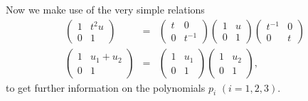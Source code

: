 Now we make use of the very simple relations
\begin{eqnarray}
\label{eq:no1a}
\left(\begin{matrix} 1 & t^2u \\ 0 & 1\end{matrix}\right) &=&
\left(\begin{matrix} t & 0 \\ 0 & t^{-1}  \end{matrix}\right) 
\left(\begin{matrix} 1 & u \\ 0 & 1 \end{matrix}\right) 
\left(\begin{matrix}  t^{-1} & 0 \\ 0 & t \end{matrix}\right) \\
\label{eq:no2a}
\left(\begin{matrix} 1 & u_1 + u_2 \\ 0 & 1 \end{matrix}\right) &=&
\left(\begin{matrix} 1 & u_1 \\ 0 & 1 \end{matrix}\right) 
\left(\begin{matrix} 1 & u_2 \\ 0 & 1 \end{matrix}\right),
\end{eqnarray}
to get further information on the polynomials $p_i$ $(i=1,2,3)$.

